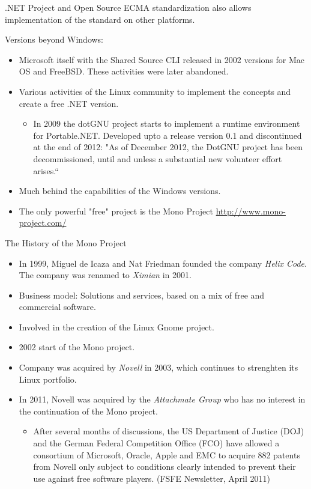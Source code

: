 \documentclass{beamer}
\begin{document}
\begin{frame}{.NET Project and Open Source}
ECMA standardization also allows implementation of the standard
on other platforms.\vspace{-1em}

Versions beyond Windows:\vspace{-1em}
\begin{itemize}
\item Microsoft itself with the Shared Source CLI released in 2002 versions
  for Mac OS and FreeBSD. These activities were later abandoned.
\item Various activities of the Linux community to implement the concepts and
  create a free .NET version.
  \begin{itemize}
  \item In 2009 the dotGNU project starts to implement a runtime
    environment for Portable.NET. Developed upto a release version 0.1 and
    discontinued at the end of 2012: "As of December 2012, the DotGNU project
    has been decommissioned, until and unless a substantial new volunteer
    effort arises.“
  \end{itemize}
\item Much behind the capabilities of the Windows versions.
\item The only powerful "free" project is the Mono Project
  \url{http://www.mono-project.com/}
\end{itemize}
\end{frame}

\begin{frame}{The History of the Mono Project}
\begin{itemize}
\item In 1999, Miguel de Icaza and Nat Friedman founded the company
  \emph{Helix Code}.  The company was renamed to \emph{Ximian} in 2001.
\item Business model: Solutions and services, based on a mix of free and
  commercial software.
\item Involved in the creation of the Linux Gnome project.
\item 2002 start of the Mono project.
\item Company was acquired by \emph{Novell} in 2003, which continues to
  strenghten its Linux portfolio.
\item In 2011, Novell was acquired by the \emph{Attachmate Group} who has no
  interest in the continuation of the Mono project.
  \begin{itemize}
  \item After several months of discussions, the US Department of Justice
    (DOJ) and the German Federal Competition Office (FCO) have allowed a
    consortium of Microsoft, Oracle, Apple and EMC to acquire 882 patents from
    Novell only subject to conditions clearly intended to prevent their use
    against free software players.  (FSFE Newsletter, April 2011)
  \end{itemize}
\end{itemize}
\end{frame}
\end{document}
